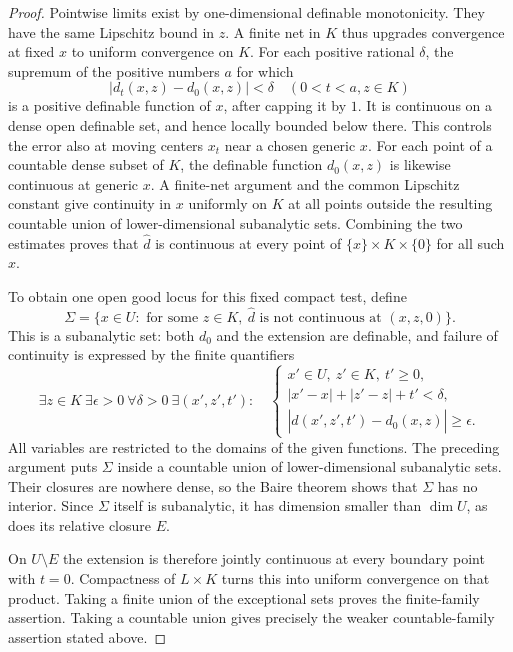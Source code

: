 \begin{proof}
Pointwise limits exist by one-dimensional definable monotonicity.
They have the same Lipschitz bound in $z$. A finite net in $K$ thus
upgrades convergence at fixed $x$ to uniform convergence on $K$.
For each positive rational $\delta$, the supremum of the positive
numbers $a$ for which
\[
 |d_t(x,z)-d_0(x,z)|<\delta
       \quad(0<t<a, z\in K)
\]
is a positive definable function of $x$, after capping it by $1$.
It is continuous on a dense open definable set, and hence locally
bounded below there. This controls the error also at moving centers
$x_t$ near a chosen generic $x$. For each point of a countable dense
subset of $K$, the definable function $d_0(x,z)$ is likewise
continuous at generic $x$. A finite-net argument and the common
Lipschitz constant give continuity in $x$ uniformly on $K$ at all
points outside the resulting countable union of lower-dimensional
subanalytic sets. Combining the two estimates proves that
$\widehat d$ is continuous at every point of $\{x\}\times K\times\{0\}$
for all such $x$.

To obtain one open good locus for this fixed compact test, define
\[
 \Sigma=\{x\in U:\text{ for some }z\in K,\
        \widehat d\text{ is not continuous at }(x,z,0)\}.
\]
This is a subanalytic set: both $d_0$ and the extension are
definable, and failure of continuity is expressed by the finite
quantifiers
\[
 \exists z\in K\ \exists\epsilon>0\ \forall\delta>0\
 \exists(x',z',t'):\quad
 \begin{cases}
 x'\in U,\ z'\in K,\ t'\geq0,\\
 |x'-x|+|z'-z|+t'<\delta,\\
 |\widehat d(x',z',t')-d_0(x,z)|\geq\epsilon.
 \end{cases}
\]
All variables are restricted to the domains of the given functions.
The preceding argument puts $\Sigma$ inside a countable union of
lower-dimensional subanalytic sets. Their closures are nowhere
dense, so the Baire theorem shows that $\Sigma$ has no interior.
Since $\Sigma$ itself is subanalytic, it has dimension smaller
than $\dim U$, as does its relative closure $E$.

On $U\setminus E$ the extension is therefore jointly continuous
at every boundary point with $t=0$. Compactness of $L\times K$
turns this into uniform convergence on that product. Taking a
finite union of the exceptional sets proves the finite-family
assertion. Taking a countable union gives precisely the weaker
countable-family assertion stated above.
\end{proof}

